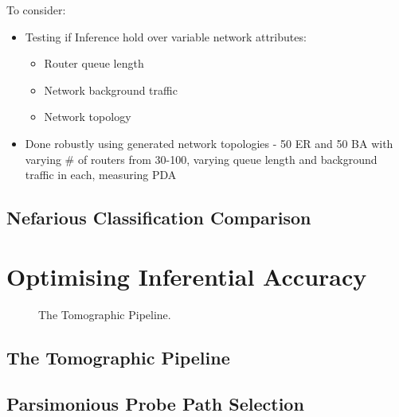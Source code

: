     To consider:
    \begin{itemize}
        \item Testing if Inference hold over variable network attributes:
        \begin{itemize}
            \item Router queue length
            \item Network background traffic
            \item Network topology
        \end{itemize}
        \item Done robustly using generated network topologies - 50 ER and 50 BA with varying \# of routers from 30-100, varying queue length and background traffic in each, measuring PDA
    \end{itemize}

  \subsection{Nefarious Classification Comparison}
  \label{ssec:Mclassificationcomparision}
  

\section{Optimising Inferential Accuracy}
\label{sec:Moptprobing}
\begin{figure}[H]
    \centering
    \caption{The Tomographic Pipeline.}
\end{figure}

\subsection{The Tomographic Pipeline}

\subsection{Parsimonious Probe Path Selection}
\label{ssec:Mpppselection}

